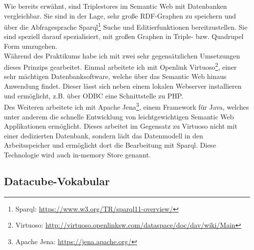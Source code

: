 \documentclass{article}
\begin{document}
Wie bereits erwähnt, sind Triplestores im Semantic Web mit Datenbanken vergleichbar. Sie sind in der Lage, sehr große RDF-Graphen zu speichern und über die Abfragesprache Sparql\footnote{Sparql: \url{https://www.w3.org/TR/sparql11-overview/}} Suche und Editierfunktionen bereitzustellen. Sie sind speziell darauf spezialisiert, mit großen Graphen in Triple- bzw. Quadrupel Form umzugehen.\\
Während des Praktikums habe ich mit zwei sehr gegensätzlichen Umsetzungen dieses Prinzips gearbeitet. Einmal arbeitete ich mit Openlink Virtuoso\footnote{Virtuoso: \url{http://virtuoso.openlinksw.com/dataspace/doc/dav/wiki/Main}}, einer sehr mächtigen Datenbanksoftware, welche über das Semantic Web hinaus Anwendung findet. Dieser lässt sich neben einem lokalen Webserver installieren und ermöglicht, z.B. über ODBC eine Schnittstelle zu PHP.\\
Des Weiteren arbeitete ich mit Apache Jena\footnote{Apache Jena: \url{https://jena.apache.org/}}, einem Framework für Java, welches unter anderem die schnelle Entwicklung von leichtgewichtigen Semantic Web Applikationen ermöglicht. Dieses arbeitet im Gegensatz zu Virtuoso nicht mit einer dedizierten Datenbank, sondern lädt das Datenmodell in den Arbeitsspeicher und ermöglicht dort die Bearbeitung mit Sparql. Diese Technologie wird auch in-memory Store genannt.

\subsection{Datacube-Vokabular}
\end{document}

